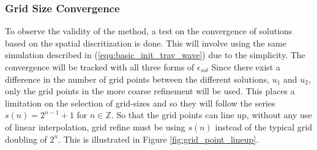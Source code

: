 
\subsubsection{Grid Size Convergence}
  To observe the validity of the method, a test on the convergence of solutions based on the spatial discritization is done.
  This will involve using the same simulation described in (\ref{equ:basic_init_trav_wave}) due to the simplicity. 
  The convergence will be tracked with all three forms of $\epsilon_{sol}$
  Since there exist a difference in the number of grid points between the different solutions, $u_1$ and $u_2$, only the grid points in the more coarse refinement will be used.
  This places a limitation on the selection of grid-sizes and so they will follow the series $s(n) = 2^{n-1}+1$ for $n \in \mathbb{Z}$.
  So that the grid points can line up, without any use of linear interpolation, grid refine must be using $s(n)$ instead of the typical grid doubling of $2^{n}$. 
  This is illustrated in Figure \ref{fig:grid_point_lineup}.


